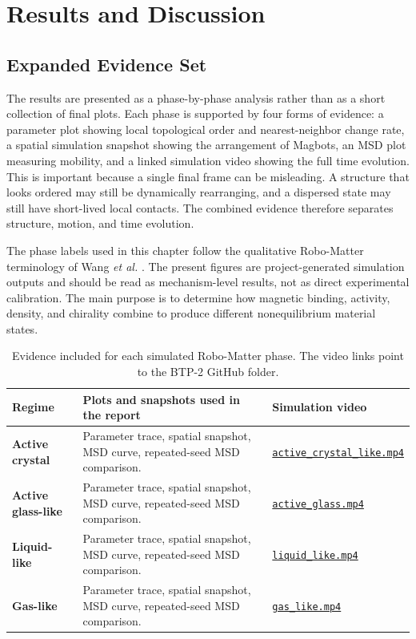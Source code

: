 \documentclass[12pt,a4paper,oneside]{report}
\newcommand{\btptwogithub}{https://github.com/suraj4556kumar-sketch/Robo_matter_duality/tree/main/BTP-2}
\begin{document}
\chapter{Results and Discussion}

\section{Expanded Evidence Set}
The results are presented as a phase-by-phase analysis rather than as a short collection of final plots. Each phase is supported by four forms of evidence: a parameter plot showing local topological order and nearest-neighbor change rate, a spatial simulation snapshot showing the arrangement of Magbots, an MSD plot measuring mobility, and a linked simulation video showing the full time evolution. This is important because a single final frame can be misleading. A structure that looks ordered may still be dynamically rearranging, and a dispersed state may still have short-lived local contacts. The combined evidence therefore separates structure, motion, and time evolution.

The phase labels used in this chapter follow the qualitative Robo-Matter terminology of Wang \textit{et al.} \cite{wang2024robomatter}. The present figures are project-generated simulation outputs and should be read as mechanism-level results, not as direct experimental calibration. The main purpose is to determine how magnetic binding, activity, density, and chirality combine to produce different nonequilibrium material states.

\begin{table}[H]
\centering
\caption{Evidence included for each simulated Robo-Matter phase. The video links point to the BTP-2 GitHub folder.}
\label{tab:phaseevidence}
\begin{tabularx}{\textwidth}{>{\bfseries}p{3.0cm}X X}
\toprule
Regime & Plots and snapshots used in the report & Simulation video \\
\midrule
Active crystal & Parameter trace, spatial snapshot, MSD curve, repeated-seed MSD comparison. & \href{\btptwogithub/states/simulation/active_crystal_like.mp4}{\texttt{active\_crystal\_like.mp4}} \\
Active glass-like & Parameter trace, spatial snapshot, MSD curve, repeated-seed MSD comparison. & \href{\btptwogithub/states/simulation/active_glass.mp4}{\texttt{active\_glass.mp4}} \\
Liquid-like & Parameter trace, spatial snapshot, MSD curve, repeated-seed MSD comparison. & \href{\btptwogithub/states/simulation/liquid_like.mp4}{\texttt{liquid\_like.mp4}} \\
Gas-like & Parameter trace, spatial snapshot, MSD curve, repeated-seed MSD comparison. & \href{\btptwogithub/states/simulation/gas_like.mp4}{\texttt{gas\_like.mp4}} \\
\bottomrule
\end{tabularx}
\end{table}
\end{document}

